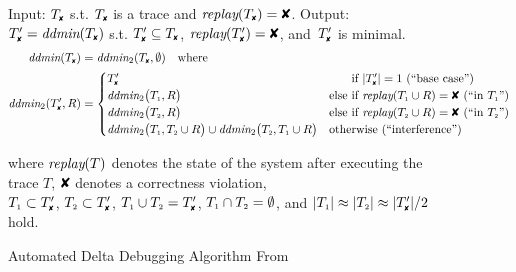 \begin{figure}[t]
\footnotesize
\begin{boxedminipage}{\textwidth}
Input: $\cfail$ s.t. $\cfail$ is a trace and $\test(\cfail) = \DFAIL$. Output: $\dfail
= \ddmin(\cfail)$ s.t. $\dfail \subseteq
\cfail$, $\test(\dfail) = \DFAIL$, and~$\dfail$ is minimal.
\begin{align*}
\ddmin(\cfail) &= \ddmin_2(\cfail, \emptyset) \quad \text{where} \\
\ddmin_2(\dfail, R) &=
\begin{cases}
\dfail & \text{\hphantom{else }if $|\dfail| = 1$ (``base case'')} \\
\ddmin_2\bigl(\done, R\bigr) &
\text{else if $\test(\done \cup R) = \DFAIL$ (``in $\done$'')} \\
\ddmin_2\bigl(\dtwo, R\bigr) &
\text{else if $\test(\dtwo \cup R) = \DFAIL$ (``in $\dtwo$'')} \\
\ddmin_2\bigl(\done, \dtwo \cup R\bigr) \cup \ddmin_2\bigl(\dtwo, \done \cup
R\bigr) & \text{otherwise (``interference'')}
\end{cases}
\end{align*}
\begin{center}
where $\textit{replay}(T)$ denotes the state of the system after executing the trace $T$,
$\DFAIL$ denotes a correctness violation, \\
$\done \subset \dfail$, $\dtwo \subset \dfail$, $\done \cup \dtwo = \dfail$, ${T_{\scriptscriptstyle 1}} \cap
{T_{\scriptscriptstyle 2}} = \emptyset$, and $|\done| \approx |\dtwo| \approx |\dfail| / 2$
hold.
\end{center}
\end{boxedminipage}
\caption{ Automated Delta Debugging Algorithm From~\cite{Zeller:1999:YMP:318773.318946}}
\label{fig:ddmin}
\end{figure}

